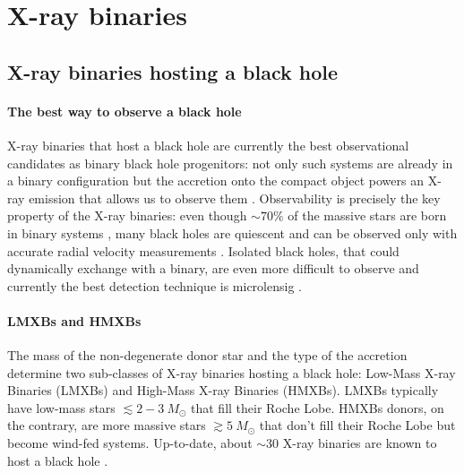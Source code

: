 \documentclass[a4paper,titlepage]{book}     	%
\newcommand{\sun}{\ensuremath{_\odot}}
\newcommand{\msun}{\ensuremath{M\sun}}
\begin{document}
\section{X-ray binaries}
\subsection{X-ray binaries hosting a black hole}\label{subsec:XraybinariesSED}
\paragraph{The best way to observe a black hole}
X-ray binaries that host a black hole are currently the best observational candidates as binary black hole progenitors: not only such systems are already in a binary configuration but the accretion onto the compact object powers an X-ray emission that allows us to observe them \cite{Xbinaries_massmeasure}. Observability is precisely the key property of the X-ray binaries: even though $\sim 70 \%$ of the massive stars are born in binary systems \cite{Sana2012}, many black holes are quiescent and can be observed only with accurate radial velocity measurements \cite{BHnoninteracting_Giesers2018}. Isolated black holes, that could dynamically exchange with a binary, are even more difficult to observe and currently the best detection technique is microlensig \cite{BHmicrolensing}.

\paragraph{LMXBs and HMXBs}
The mass of the non-degenerate donor star and the type of the accretion determine two sub-classes of X-ray binaries hosting a black hole: Low-Mass X-ray Binaries (LMXBs) and High-Mass X-ray Binaries (HMXBs). LMXBs typically have low-mass stars $\lesssim 2-3~\msun$ that fill their Roche Lobe. HMXBs donors, on the contrary, are more massive stars $\gtrsim 5~\msun$ that don't fill their Roche Lobe but become wind-fed systems. Up-to-date, about $\sim 30$ X-ray binaries are known to host a black hole \cite{HMXBH_spins2021}.
\end{document}
